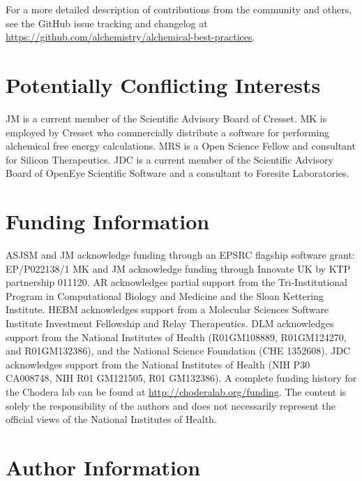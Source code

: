 \documentclass[9pt,bestpractices]{livecoms}
\newcommand{\githubrepository}{\url{https://github.com/alchemistry/alchemical-best-practices}} %
\begin{document}
For a more detailed description of contributions from the community and others, 
see the GitHub issue tracking and changelog at \githubrepository.


\section*{Potentially Conflicting Interests}
JM is a current member of the Scientific Advisory Board of Cresset. 
MK is employed by Cresset who commercially distribute a software for performing alchemical free energy calculations. MRS is a Open Science Fellow and consultant for Silicon Therapeutics.
JDC is a current member of the Scientific Advisory Board of OpenEye Scientific Software and a consultant to Foresite Laboratories.
\section*{Funding Information}
ASJSM and JM acknowledge funding through an EPSRC flagship software grant: EP/P022138/1
MK and JM acknowledge funding through Innovate UK by KTP partnership 011120.
AR acknowledges partial support from the Tri-Institutional Program in Computational Biology and Medicine and the Sloan Kettering Institute.
HEBM acknowledges support from a Molecular Sciences Software Institute Investment Fellowship and Relay Therapeutics.
DLM acknowledges support from the National Institutes of Health (R01GM108889, R01GM124270, and R01GM132386), and the National Science Foundation (CHE 1352608).
JDC acknowledges support from the National Institutes of Health (NIH P30 CA008748, NIH R01 GM121505, R01 GM132386).
A complete funding history for the Chodera lab can be found at \url{http://choderalab.org/funding}.
The content is solely the responsibility of the authors and does not necessarily represent the official views of the National Institutes of Health.

\section*{Author Information}
\makeorcid



\end{document}

